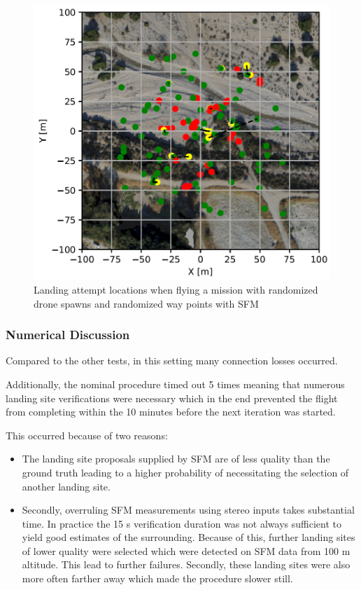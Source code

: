     \begin{figure}[h]
    \centering
    \includegraphics[scale=0.5]{images/evaluation/landing_SFM.png}
    \caption{Landing attempt locations when flying a mission with randomized drone spawns and randomized way points with SFM}
    \label{fig:land_SFM} 
    \end{figure}


    \subsubsection{Numerical Discussion}
    Compared to the other tests, in this setting many connection losses occurred. 
    
    Additionally, the nominal procedure timed out 5 times meaning that numerous landing site verifications were necessary which in the end prevented the flight from completing within the 10 minutes before the next iteration was started. 

    This occurred because of two reasons:

    \begin{itemize}
        \item The landing site proposals supplied by SFM are of less quality than the ground truth leading to a higher probability of necessitating the selection of another landing site. 
        \item Secondly, overruling SFM measurements using stereo inputs takes substantial time. In practice the 15 s verification duration was not always sufficient to yield good estimates of the surrounding. Because of this, further landing sites of lower quality were selected which were detected on SFM data from 100 m altitude. This lead to further failures. Secondly, these landing sites were also more often farther away which made the procedure slower still.
    \end{itemize}

